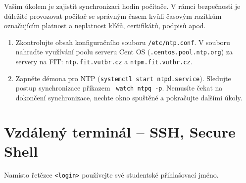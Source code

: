 \documentclass[a4paper,11pt]{article}
\begin{document}
Vašim úkolem je zajistit synchronizaci hodin počítače. V rámci bezpečnosti je
důležité provozovat počítač se správným časem kvůli časovým razítkům
označujícím platnost a neplatnost klíčů, certifikátů, podpisů apod.

\begin{enumerate}

  \item Zkontrolujte obsah konfiguračního souboru {\tt /etc/ntp.conf}. V souboru
    nahraďte využívání poolu serveru Cent OS ({\tt *.centos.pool.ntp.org}) za
    servery na FIT: {\tt ntp.fit.vutbr.cz} a {\tt ntpm.fit.vutbr.cz}.

  \item Zapněte démona pro NTP ({\tt systemctl start ntpd.service}).
    Sledujte postup synchronizace příkazem {\tt
    watch ntpq -p}. Nemusíte čekat na dokončení synchronizace, nechte okno
    spuštěné a pokračujte dalšími úkoly.

\end{enumerate}

\section{Vzdálený terminál -- SSH, Secure Shell}

Namísto řetězce {\tt <login>} používejte své studentské přihlašovací jméno.
\end{document}
